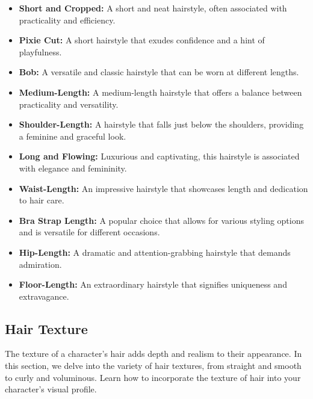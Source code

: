 \begin{itemize}
    \item \textbf{Short and Cropped:} A short and neat hairstyle, often associated with practicality and efficiency.
    \item \textbf{Pixie Cut:} A short hairstyle that exudes confidence and a hint of playfulness.
    \item \textbf{Bob:} A versatile and classic hairstyle that can be worn at different lengths.
    \item \textbf{Medium-Length:} A medium-length hairstyle that offers a balance between practicality and versatility.
    \item \textbf{Shoulder-Length:} A hairstyle that falls just below the shoulders, providing a feminine and graceful look.
    \item \textbf{Long and Flowing:} Luxurious and captivating, this hairstyle is associated with elegance and femininity.
    \item \textbf{Waist-Length:} An impressive hairstyle that showcases length and dedication to hair care.
    \item \textbf{Bra Strap Length:} A popular choice that allows for various styling options and is versatile for different occasions.
    \item \textbf{Hip-Length:} A dramatic and attention-grabbing hairstyle that demands admiration.
    \item \textbf{Floor-Length:} An extraordinary hairstyle that signifies uniqueness and extravagance.
\end{itemize}

\subsection{\textbf{Hair Texture}}

The texture of a character's hair adds depth and realism to their appearance. In this section, we delve into the variety of hair textures, from straight and smooth to curly and voluminous. Learn how to incorporate the texture of hair into your character's visual profile.

